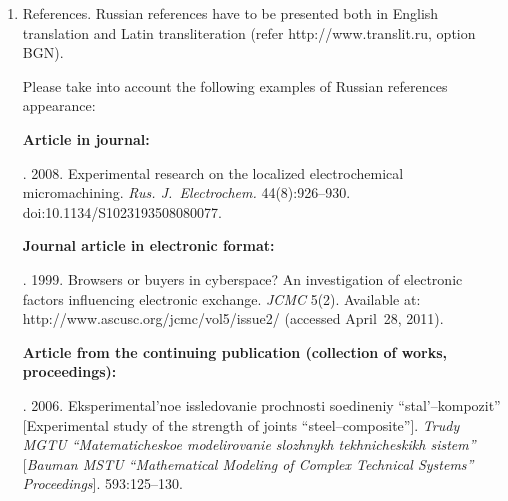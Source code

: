 {\begin{enumerate}[1.]
\begin{itemize}
\def\leftkol{Requirements for manuscripts submitted to Journal
``Informatics~and~Applications''}

\def\rightkol{Requirements for manuscripts submitted to Journal
``Informatics~and~Applications''}



\item abstract (not less than 100 words) both in Russian and in English. Abstract is a short
summary of the article that can be published separately. The abstract is the
main source of information on the article and it could be included in leading information
systems and data bases. The abstract in English has to be an original text and should
not be an exact translation of the Russian one. Good English is required.
In abstracts, avoid references and formulae;\\[-13.5pt]
\item indexing is performed on the basis of keywords. The use of keywords from the
internationally accepted thematic Thesauri is recommended.

Important! Keywords must not be sentences;
\item Acknowledgments.
\end{itemize}

\item References. Russian references have to be presented both in English translation and Latin
transliteration (refer {\sf http://www.translit.ru}, option BGN).

Please take into account the following examples of Russian references appearance:

\noindent
\textbf{Article in journal:}

. 2008. Experimental research on the localized electrochemical
micromachining.
\textit{Rus. J.~Electrochem.}  44(8):926--930. {\sf doi:10.1134/S1023193508080077}.


\noindent
\textbf{Journal article in electronic format:}

. 1999. Browsers or buyers in
cyberspace? An
investigation of electronic factors influencing electronic exchange. \textit{JCMC}
5(2). Available at: {\sf http://www.ascusc.org/jcmc/vol5/issue2/} (accessed April~28, 2011).




\noindent
\textbf{Article from the continuing publication (collection of works, proceedings):}

. 2006. Eksperimental'noe
issledovanie prochnosti soedineniy ``stal'--kompozit'' [Experimental study of
the strength of joints ``steel--composite'']. \textit{Trudy MGTU
``Matematicheskoe modelirovanie slozhnykh tekh\-ni\-che\-skikh sistem''}
[\textit{Bauman MSTU ``Mathematical Modeling of Complex Technical
Systems'' Proceedings}]. 593:125--130.


\end{enumerate}}
